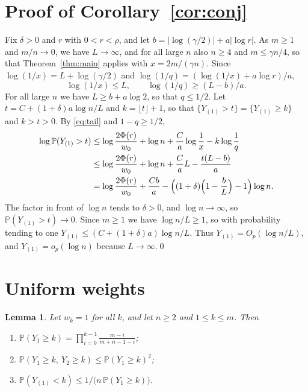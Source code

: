 \documentclass[11pt]{amsart}
\newtheorem{lemma}[theorem]{Lemma}
\theoremstyle{remark}
\numberwithin{equation}{section}
\newcommand{\Pp}{\mathbb P}
\begin{document}
\section{Proof of Corollary~\ref{cor:conj}}\label{sec:cor}

Fix $\delta>0$ and $r$ with $0<r<\rho$, and let $b=|\log(\gamma/2)|+a|\log r|$. As $m\ge1$ and $m/n\to0$, we have $L\to\infty$, and for all large $n$ also $n\ge4$ and $m\le\gamma n/4$, so that Theorem~\ref{thm:main} applies with $x=2m/(\gamma n)$. Since $\log(1/x)=L+\log(\gamma/2)$ and $\log(1/q)=(\log(1/x)+a\log r)/a$,
\[
\log(1/x)\le L,\qquad\log(1/q)\ge(L-b)/a .
\]
For all large $n$ we have $L\ge b+a\log2$, so that $q\le1/2$. Let $t=C+(1+\delta)a\log n/L$ and $k=\lfloor t\rfloor+1$, so that $\{Y_{(1)}>t\}=\{Y_{(1)}\ge k\}$ and $k>t>0$. By \eqref{eq:tail} and $1-q\ge1/2$,
\begin{align*}
\log\Pp(Y_{(1)}>t)&\le\log\frac{2\Phi(r)}{w_0}+\log n+\frac Ca\log\frac1x-k\log\frac1q\\
&\le\log\frac{2\Phi(r)}{w_0}+\log n+\frac CaL-\frac{t(L-b)}a\\
&=\log\frac{2\Phi(r)}{w_0}+\frac{Cb}a-\Bigl((1+\delta)\Bigl(1-\frac bL\Bigr)-1\Bigr)\log n .
\end{align*}
The factor in front of $\log n$ tends to $\delta>0$, and $\log n\to\infty$, so $\Pp(Y_{(1)}>t)\to0$. Since $m\ge1$ we have $\log n/L\ge1$, so with probability tending to one $Y_{(1)}\le(C+(1+\delta)a)\log n/L$. Thus $Y_{(1)}=O_p(\log n/L)$, and $Y_{(1)}=o_p(\log n)$ because $L\to\infty$.\qed

\section{Uniform weights}\label{sec:uniform}

\begin{lemma}\label{lem:be}
Let $w_k=1$ for all $k$, and let $n\ge2$ and $1\le k\le m$. Then
\begin{enumerate}[label=\textup{(\roman*)}]
\item $\Pp(Y_1\ge k)=\prod_{i=0}^{k-1}\frac{m-i}{m+n-1-i}$;
\item $\Pp(Y_1\ge k,\ Y_2\ge k)\le\Pp(Y_1\ge k)^2$;
\item $\Pp(Y_{(1)}<k)\le1/\bigl(n\,\Pp(Y_1\ge k)\bigr)$.
\end{enumerate}
\end{lemma}
\end{document}
